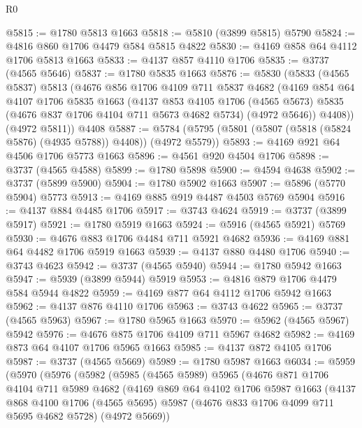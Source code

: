 \begin{lexlean}{R0}
\begin{coremodule}
@5815 := @1780 @5813 @1663
@5818 := @5810 (@3899 @5815) @5790
@5824 := @4816 @860 @1706 @4479 @584 @5815 @4822
@5830 := @4169 @858 @64 @4112 @1706 @5813 @1663
@5833 := @4137 @857 @4110 @1706
@5835 := @3737 (@4565 @5646)
@5837 := @1780 @5835 @1663
@5876 := @5830
    (@5833
      (@4565 @5837)
      @5813
      (@4676
        @856
        @1706
        @4109
        @711
        @5837
        @4682
        (@4169
          @854
          @64
          @4107
          @1706
          @5835
          @1663
          (@4137
            @853
            @4105
            @1706
            (@4565 @5673)
            @5835
            (@4676 @837 @1706 @4104 @711 @5673 @4682 @5734)
            (@4972 @5646))
          @4408))
      (@4972 @5811))
    @4408
@5887 := @5784 (@5795 (@5801 (@5807 (@5818 (@5824 @5876) (@4935 @5788)) @4408)) (@4972 @5579))
@5893 := @4169 @921 @64 @4506 @1706 @5773 @1663
@5896 := @4561 @920 @4504 @1706
@5898 := @3737 (@4565 @4588)
@5899 := @1780 @5898
@5900 := @4594 @4638
@5902 := @3737 (@5899 @5900)
@5904 := @1780 @5902 @1663
@5907 := @5896 (@5770 @5904) @5773
@5913 := @4169 @885 @919 @4487 @4503 @5769 @5904
@5916 := @4137 @884 @4485 @1706
@5917 := @3743 @4624
@5919 := @3737 (@3899 @5917)
@5921 := @1780 @5919 @1663
@5924 := @5916 (@4565 @5921) @5769
@5930 := @4676 @883 @1706 @4484 @711 @5921 @4682
@5936 := @4169 @881 @64 @4482 @1706 @5919 @1663
@5939 := @4137 @880 @4480 @1706
@5940 := @3743 @4623
@5942 := @3737 (@4565 @5940)
@5944 := @1780 @5942 @1663
@5947 := @5939 (@3899 @5944) @5919
@5953 := @4816 @879 @1706 @4479 @584 @5944 @4822
@5959 := @4169 @877 @64 @4112 @1706 @5942 @1663
@5962 := @4137 @876 @4110 @1706
@5963 := @3743 @4622
@5965 := @3737 (@4565 @5963)
@5967 := @1780 @5965 @1663
@5970 := @5962 (@4565 @5967) @5942
@5976 := @4676 @875 @1706 @4109 @711 @5967 @4682
@5982 := @4169 @873 @64 @4107 @1706 @5965 @1663
@5985 := @4137 @872 @4105 @1706
@5987 := @3737 (@4565 @5669)
@5989 := @1780 @5987 @1663
@6034 := @5959
    (@5970
      (@5976
        (@5982
          (@5985
            (@4565 @5989)
            @5965
            (@4676
              @871
              @1706
              @4104
              @711
              @5989
              @4682
              (@4169
                @869
                @64
                @4102
                @1706
                @5987
                @1663
                (@4137
                  @868
                  @4100
                  @1706
                  (@4565 @5695)
                  @5987
                  (@4676 @833 @1706 @4099 @711 @5695 @4682 @5728)
                  (@4972 @5669))

\end{coremodule}
\end{lexlean}
